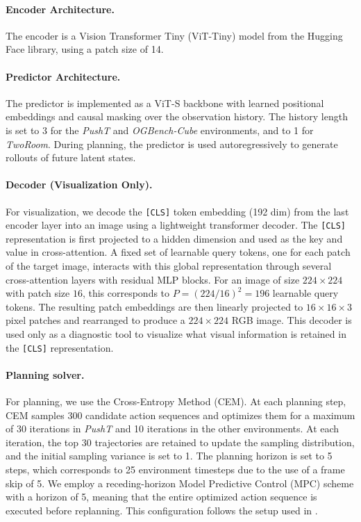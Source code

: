 \paragraph{Encoder Architecture.}
The encoder is a Vision Transformer Tiny (ViT-Tiny) model from the Hugging Face library, using a patch size of 14.

\paragraph{Predictor Architecture.}
The predictor is implemented as a ViT-S backbone with learned positional embeddings and causal masking over the observation history. The history length is set to 3 for the \textit{PushT} and \textit{OGBench-Cube} environments, and to 1 for \textit{TwoRoom}. During planning, the predictor is used autoregressively to generate rollouts of future latent states.


\paragraph{Decoder (Visualization Only).}
For visualization, we decode the \verb|[CLS]| token embedding (192 dim) from the last encoder layer into an image using a lightweight transformer decoder. The \verb|[CLS]| representation is first projected to a hidden dimension and used as the key and value in cross-attention. A fixed set of learnable query tokens, one for each patch of the target image, interacts with this global representation through several cross-attention layers with residual MLP blocks. For an image of size $224\times224$ with patch size $16$, this corresponds to $P=(224/16)^2=196$ learnable query tokens. The resulting patch embeddings are then linearly projected to $16 \times 16 \times 3$ pixel patches and rearranged to produce a $224 \times 224$ RGB image. This decoder is used only as a diagnostic tool to visualize what visual information is retained in the \verb|[CLS]| representation.

\paragraph{Planning solver.}
For planning, we use the Cross-Entropy Method (CEM). At each planning step, CEM samples 300 candidate action sequences and optimizes them for a maximum of 30 iterations in \textit{PushT} and 10 iterations in the other environments. At each iteration, the top 30 trajectories are retained to update the sampling distribution, and the initial sampling variance is set to 1. The planning horizon is set to 5 steps, which corresponds to 25 environment timesteps due to the use of a frame skip of 5. We employ a receding-horizon Model Predictive Control (MPC) scheme with a horizon of 5, meaning that the entire optimized action sequence is executed before replanning. This configuration follows the setup used in \cite{zhou2025dino-wm}.

